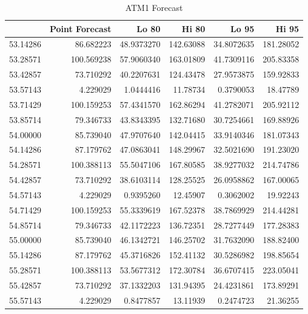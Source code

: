 \documentclass[openany]{book}
\begin{document}
\begin{table}[H]

\caption{\label{tab:unnamed-chunk-11}ATM1 Forecast}
\centering
\begin{tabular}{l|r|r|r|r|r}
\hline
\textbf{ } & \textbf{Point Forecast} & \textbf{Lo 80} & \textbf{Hi 80} & \textbf{Lo 95} & \textbf{Hi 95}\\
\hline
\rowcolor{gray!6}  53.14286 & 86.682223 & 48.9373270 & 142.63088 & 34.8072635 & 181.28052\\
\hline
53.28571 & 100.569238 & 57.9060340 & 163.01809 & 41.7309116 & 205.83358\\
\hline
\rowcolor{gray!6}  53.42857 & 73.710292 & 40.2207631 & 124.43478 & 27.9573875 & 159.92833\\
\hline
53.57143 & 4.229029 & 1.0444416 & 11.78734 & 0.3790053 & 18.47789\\
\hline
\rowcolor{gray!6}  53.71429 & 100.159253 & 57.4341570 & 162.86294 & 41.2782071 & 205.92112\\
\hline
53.85714 & 79.346733 & 43.8343395 & 132.71680 & 30.7254661 & 169.88926\\
\hline
\rowcolor{gray!6}  54.00000 & 85.739040 & 47.9707640 & 142.04415 & 33.9140346 & 181.07343\\
\hline
54.14286 & 87.179762 & 47.0863041 & 148.29967 & 32.5021690 & 191.23020\\
\hline
\rowcolor{gray!6}  54.28571 & 100.388113 & 55.5047106 & 167.80585 & 38.9277032 & 214.74786\\
\hline
54.42857 & 73.710292 & 38.6103114 & 128.25525 & 26.0958862 & 167.00065\\
\hline
\rowcolor{gray!6}  54.57143 & 4.229029 & 0.9395260 & 12.45907 & 0.3062002 & 19.92243\\
\hline
54.71429 & 100.159253 & 55.3339619 & 167.52378 & 38.7869929 & 214.44281\\
\hline
\rowcolor{gray!6}  54.85714 & 79.346733 & 42.1172223 & 136.72351 & 28.7277449 & 177.28383\\
\hline
55.00000 & 85.739040 & 46.1342721 & 146.25702 & 31.7632090 & 188.82400\\
\hline
\rowcolor{gray!6}  55.14286 & 87.179762 & 45.3716826 & 152.41132 & 30.5286982 & 198.85654\\
\hline
55.28571 & 100.388113 & 53.5677312 & 172.30784 & 36.6707415 & 223.05041\\
\hline
\rowcolor{gray!6}  55.42857 & 73.710292 & 37.1332203 & 131.94395 & 24.4231861 & 173.89291\\
\hline
55.57143 & 4.229029 & 0.8477857 & 13.11939 & 0.2474723 & 21.36255\\

\end{tabular}
\end{table}
\end{document}
